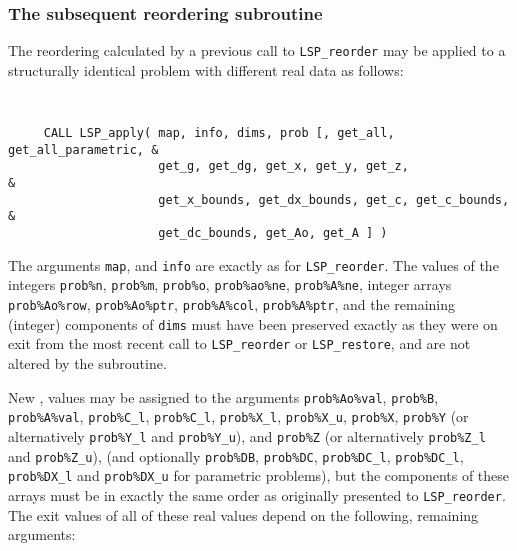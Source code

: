 \documentclass{galahad}
\newcommand{\packagename}{LSP}
\begin{document}

\subsubsection{The subsequent reordering subroutine}
The reordering calculated by a previous call to {\tt \packagename\_reorder}
may be applied to a structurally identical problem with different real data
as follows:

\vspace*{-2mm}
{\tt
\begin{verbatim}
     CALL LSP_apply( map, info, dims, prob [, get_all, get_all_parametric, &
                     get_g, get_dg, get_x, get_y, get_z,                   &
                     get_x_bounds, get_dx_bounds, get_c, get_c_bounds,     &
                     get_dc_bounds, get_Ao, get_A ] )
\end{verbatim}
}
\vspace*{-1mm}
\noindent
The arguments {\tt map}, and {\tt info} are exactly as for
{\tt \packagename\_reorder}. The values of the integers
{\tt prob\%n}, {\tt prob\%m}, {\tt prob\%o},
{\tt prob\%ao\%ne}, {\tt prob\%A\%ne},
integer arrays {\tt prob\%Ao\%row}, {\tt prob\%Ao\%ptr},
{\tt prob\%A\%col}, {\tt prob\%A\%ptr}, and the remaining (integer)
components of {\tt dims} must
have been preserved exactly as they were on exit from the most recent
call to {\tt \packagename\_reorder} or {\tt \packagename\_restore},
and are not altered by the subroutine.

New \realdp, values may be assigned to the arguments
{\tt prob\%Ao\%val}, {\tt prob\%B}, {\tt prob\%A\%val}, {\tt prob\%C\_l},
{\tt prob\%C\_l}, {\tt prob\%X\_l}, {\tt prob\%X\_u}, {\tt prob\%X},
{\tt prob\%Y}
(or alternatively {\tt prob\%Y\_l} and {\tt prob\%Y\_u}),
and {\tt prob\%Z}
(or alternatively {\tt prob\%Z\_l} and {\tt prob\%Z\_u}),
(and optionally
{\tt prob\%DB}, {\tt prob\%DC}, {\tt prob\%DC\_l}, {\tt prob\%DC\_l},
{\tt prob\%DX\_l} and {\tt prob\%DX\_u} for parametric problems),
but the components of these arrays
must be in exactly the same order as originally presented to
{\tt \packagename\_reorder}.
The exit values of all of these real values depend on the following,
remaining arguments:
\end{document}
